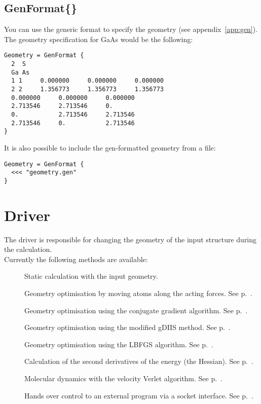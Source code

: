\subsection{GenFormat\{\}}
\label{sec:dftbp.GenFormat}

You can use the generic format to specify the geometry (see
appendix~\ref{app:gen}). The geometry specification for GaAs would be
the following:
\begin{verbatim}
Geometry = GenFormat {
  2  S
  Ga As
  1 1     0.000000     0.000000     0.000000
  2 2     1.356773     1.356773     1.356773
  0.000000     0.000000     0.000000
  2.713546     2.713546     0.
  0.           2.713546     2.713546
  2.713546     0.           2.713546
}
\end{verbatim}
It is also possible to include the gen-formatted geometry from a file:
\begin{verbatim}
Geometry = GenFormat {
  <<< "geometry.gen"
}
\end{verbatim}


\section{Driver}
\label{sec:dftbp.Driver}

The driver is responsible for changing the geometry of the input
structure during the calculation.\\ \bigskip Currently the following
methods are available:
\begin{description}
\item[\iscb{}] Static calculation with the input geometry.
\item[] Geometry optimisation by moving atoms
  along the acting forces. See p.~.
\item[] Geometry optimisation using the
  conjugate gradient algorithm. See p.~.
\item[] Geometry optimisation using the modified gDIIS
  method. See p.~.
\item[] Geometry optimisation using the LBFGS
  algorithm. See p.~.
\item[] Calculation of the second derivatives of the
  energy (the Hessian). See p.~.
\item[] Molecular dynamics with the velocity
  Verlet algorithm. See p.~.
\item[] Hands over control to an external program via a socket
  interface. See p.~.
\end{description}


